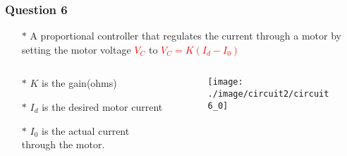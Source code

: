 \documentclass{beamer}
\newcommand{\red}[1]{\textcolor{red}{#1}}
\begin{document}

\begin{frame}
\frametitle{Question 6}

\begin{itemize} \itemsep1pt \parskip0pt 
  \item[$\ast$] A proportional controller that regulates the
current through a motor by setting the motor
voltage \red{$V_C$} to \red{$V_C = K(I_d - I_0)$}
\end{itemize}


\begin{columns}

\begin{column}{4cm}
\begin{itemize} \itemsep1pt \parskip0pt 
  \item[$\ast$] $K$ is the gain(ohms)
  \item[$\ast$] $I_d$ is the desired motor current
  \item[$\ast$] $I_0$ is the actual current through the motor.
\end{itemize}
\end{column}


\begin{column}{8cm}
\begin{figure}[H]
  \centering
  \texttt{[image: ./image/circuit2/circuit6\_0]}
\end{figure}
\end{column}

\end{columns}

\end{frame}

\end{document}
